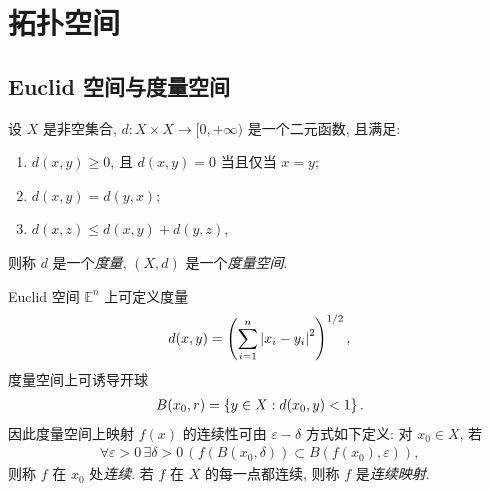 \section{拓扑空间}
\subsection{Euclid 空间与度量空间}

    \begin{Definition}[度量空间]
        设 $ X $ 是非空集合, $ d: X\times X\to [0, +\infty) $ 是一个二元函数, 且满足:
        \begin{enumerate}
            \item $ d(x, y)\geqslant 0 $, 且 $ d(x, y)=0 $ 当且仅当 $ x=y $;
            \item $ d(x, y)=d(y, x) $;
            \item $ d(x, z)\leqslant d(x, y)+d(y, z) $,
        \end{enumerate}
        则称 $ d $ 是一个\emph{度量}, $ (X, d) $ 是一个\emph{度量空间}.
    \end{Definition}

    Euclid 空间 $ \mathbb{E}^{n} $ 上可定义度量
    \begin{align*}
        d(x, y)=\left( \sum\limits_{i=1}^{n}\left| x_{i}-y_{i} \right| ^{2} \right)^{1/2},
    \end{align*}
    度量空间上可诱导开球
    \begin{align*}
        B(x_{0}, r)=\left\{ y\in X: d(x_{0}, y)<1 \right\}.
    \end{align*}
    因此度量空间上映射 $ f(x) $ 的连续性可由 $ \varepsilon-\delta $ 方式如下定义: 对 $ x_{0}\in X $, 若
    \begin{align*}
        \forall\varepsilon>0\,\exists \delta>0\,(f(B(x_{0}, \delta))\subset B(f(x_{0}), \varepsilon)),
    \end{align*}
    则称 $ f $ 在 $ x_{0} $ 处\emph{连续}. 若 $ f $ 在 $ X $ 的每一点都连续, 则称 $ f $ 是\emph{连续映射}.

